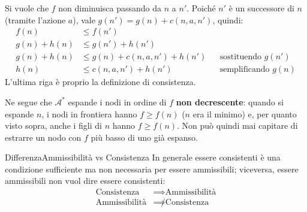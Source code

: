 \documentclass[a4paper, 11pt, oneside]{book}
\theoremstyle{definition}
\begin{document}
    \begin{center}
    \end{center}

    Si vuole che $f$ non diminuisca passando da $n$ a $n'$. Poich\'e $n'$ \`e un successore
    di $n$ (tramite l'azione $a$), vale $g(n') = g(n) + c(n, a, n')$, quindi:
    \begin{align*}
        f(n)        &\leq f(n') \\
        g(n) + h(n) &\leq g(n') + h(n') \\
        g(n) + h(n) &\leq g(n) + c(n, a, n') + h(n')
            && \text{sostituendo } g(n') \\
        h(n)        &\leq c(n, a, n') + h(n')
            && \text{semplificando } g(n)
    \end{align*}
    L'ultima riga \`e proprio la definizione di consistenza.

    Ne segue che $\mathcal{A}^*$ espande i nodi in ordine di $f$ \textbf{non decrescente}:
    quando si espande $n$, i nodi in frontiera hanno $f \geq f(n)$ ($n$ era il minimo) e, per
    quanto visto sopra, anche i figli di $n$ hanno $f \geq f(n)$. Non pu\`o quindi mai capitare di 
    estrarre un nodo con $f$ pi\`u basso di uno gi\`a espanso.

    \begin{nota}{Differenza}{Ammissibilit\`a vs Consistenza}
        In generale essere consistenti \`e una condizione sufficiente ma non necessaria per essere
        ammissibili; viceversa, essere ammissibili non vuol dire essere consistenti:
        \begin{align*}
            \text{Consistenza}     &\implies    \text{Ammissibilit\`a} \\
            \text{Ammissibilit\`a} &\not\implies \text{Consistenza}
        \end{align*}
    \end{nota}
\end{document}

